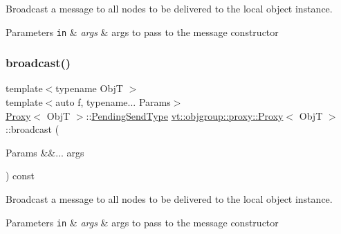 Broadcast a message to all nodes to be delivered to the local object instance. 


\begin{DoxyParams}[1]{Parameters}
\mbox{\tt in}  & {\em args} & args to pass to the message constructor \\
\hline
\end{DoxyParams}
\mbox{\label{structvt_1_1objgroup_1_1proxy_1_1_proxy_a2ea1ee920d73633a4c57f45298f9706f}} 
\subsubsection{\texorpdfstring{broadcast()}{broadcast()}\hspace{0.1cm}{\footnotesize\ttfamily [4/4]}}
{\footnotesize\ttfamily template$<$typename ObjT $>$ \\
template$<$auto f, typename... Params$>$ \\
\hyperlink{structvt_1_1objgroup_1_1proxy_1_1_proxy}{Proxy}$<$ ObjT $>$\+::\hyperlink{structvt_1_1objgroup_1_1proxy_1_1_proxy_a1bdf8713203531d306702a024872bb08}{Pending\+Send\+Type} \hyperlink{structvt_1_1objgroup_1_1proxy_1_1_proxy}{vt\+::objgroup\+::proxy\+::\+Proxy}$<$ ObjT $>$\+::broadcast (\begin{DoxyParamCaption}\item[{Params \&\&...}]{args }\end{DoxyParamCaption}) const}



Broadcast a message to all nodes to be delivered to the local object instance. 


\begin{DoxyParams}[1]{Parameters}
\mbox{\tt in}  & {\em args} & args to pass to the message constructor \\
\hline
\end{DoxyParams}
\mbox{\label{structvt_1_1objgroup_1_1proxy_1_1_proxy_a7006ef75ce5ab6b1c8f28c62f72b81a6}} 
